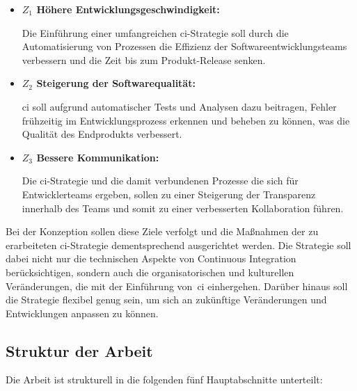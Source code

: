 \begin{itemize}
    \item {
        \textbf{$Z_1$ Höhere Entwicklungsgeschwindigkeit:}\par
        Die Einführung einer umfangreichen \acrshort{ci}-Strategie soll durch die Automatisierung von Prozessen die
        Effizienz der Softwareentwicklungsteams verbessern und die Zeit bis zum Produkt-Release senken.
    }

    \item {
        \textbf{$Z_2$ Steigerung der Softwarequalität:}\par
        \acrshort{ci} soll aufgrund automatischer Tests und Analysen dazu beitragen, Fehler frühzeitig im
        Entwicklungsprozess erkennen und beheben zu können, was die Qualität des Endprodukts verbessert.
    }

    \item{
        \textbf{$Z_3$ Bessere Kommunikation:}\par
        Die \acrshort{ci}-Strategie und die damit verbundenen Prozesse die sich für Entwicklerteams ergeben, sollen
        zu einer Steigerung der Transparenz innerhalb des Teams und somit zu einer verbesserten Kollaboration
        führen.
    }
\end{itemize}

Bei der Konzeption sollen diese Ziele verfolgt und die Maßnahmen der zu erarbeiteten \acrshort{ci}-Strategie
dementsprechend ausgerichtet werden.
Die Strategie soll dabei nicht nur die technischen Aspekte von Continuous Integration berücksichtigen, sondern auch die
organisatorischen und kulturellen Veränderungen, die mit der Einführung von\ \acrshort{ci} einhergehen.
Darüber hinaus soll die Strategie flexibel genug sein, um sich an zukünftige Veränderungen und Entwicklungen anpassen
zu können.

\subsection{Struktur der Arbeit} \label{subsec:01-introduction-3}

Die Arbeit ist strukturell in die folgenden fünf Hauptabschnitte unterteilt:

